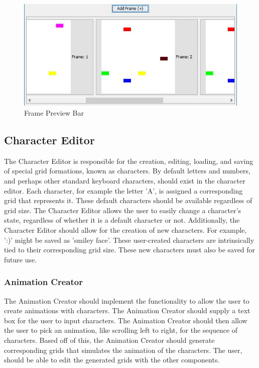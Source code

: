 \documentclass[12pt]{article}
\begin{document}
	\begin{figure}[ht!]
		\centering
		\includegraphics[width=150mm]{potoFramePre.JPG}
		\caption{Frame Preview Bar}
	\end{figure}

	
	\subsection { Character Editor}
  	The Character Editor is responsible for the creation, editing, loading, and saving of special grid formations, known as characters. By default letters and numbers, and perhaps other standard keyboard characters, should exist in the character editor. Each character, for example the letter 'A', is assigned a corresponding grid that represents it.	
  	These default characters should be available regardless of grid size. The Character Editor allows the user to easily change a character's state, regardless of whether it is a default character or not.	
  	Additionally, the Character Editor should allow for the creation of new characters. For example, ':)' might be saved as 'smiley face'. These user-created characters are intrinsically tied to their corresponding grid size. These new characters must also be saved for future use.
	
	\subsubsection{Animation Creator}
  	The Animation Creator should implement the functionality to allow the user to create animations with characters. The Animation Creator should supply a text box for the user to input characters. The Animation Creator should then allow the user to pick an animation, like scrolling left to right, for the sequence of characters.	
  	Based off of this, the Animation Creator should generate corresponding grids that simulates the animation of the characters. The user, should be able to edit the generated grids with the other components. 
	
\end{document}
